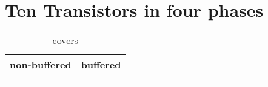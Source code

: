 \section{Ten Transistors in four phases}

\begin{table}[ht]
\centering
\caption*{covers}

\begin{tabular}{cc}
    \toprule
    non-buffered & buffered \\
    \midrule

    \nameref{cell:AOAOI2111} & \nameref{cell:AOAO2111} \\
    \nameref{cell:OAOAI2111} & \nameref{cell:OAOA2111}

\end{tabular}

\end{table}

 
 
